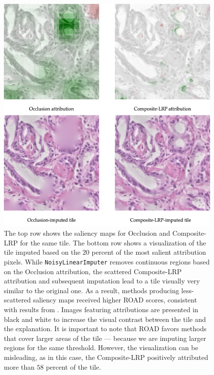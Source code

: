 \begin{figure}
    \begin{center}
    \begin{minipage}{0.8\textwidth}
      \includegraphics[width=\textwidth]{img/road-impute.png}
    \end{minipage}
    \caption{
    The top row shows the saliency maps for Occlusion and Composite-LRP for the same tile.
    The bottom row shows a visualization of the tile imputed based on the $20$ percent of the most salient attribution pixels.
    While \texttt{NoisyLinearImputer} removes continuous regions based on the Occlusion attribution, the scattered Composite-LRP attribution and subsequent imputation lead to a tile visually very similar to the original one.
    As a result, methods producing less-scattered saliency maps received higher ROAD scores, consistent with results from \cite{gallo}.
    Images featuring attributions are presented in black and white to increase the visual contrast between the tile and the explanation.
    It is important to note that ROAD favors methods that cover larger areas of the tile --- because we are imputing larger regions for the same threshold.
    However, the visualization can be misleading, as in this case, the Composite-LRP positively attributed more than $58$ percent of the tile.
    }
    \label{fig:road-impute}
    \end{center}
\end{figure}

